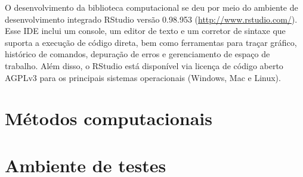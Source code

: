 O desenvolvimento da biblioteca computacional se deu por meio do ambiente de desenvolvimento integrado RStudio versão 0.98.953 (\url{http://www.rstudio.com/}). Esse IDE inclui um console, um editor de texto e um corretor de sintaxe que suporta a execução de código direta, bem como ferramentas para traçar gráfico, histórico de comandos, depuração de erros e gerenciamento de espaço de trabalho. Além disso, o RStudio está disponível via licença de código aberto AGPLv3 para os principais sistemas operacionais (Windows, Mac e Linux).

\section{Métodos computacionais} %
\label{sec:m_todos_computacionais}


\section{Ambiente de testes} %
\label{sec:ambiente_de_testes}

